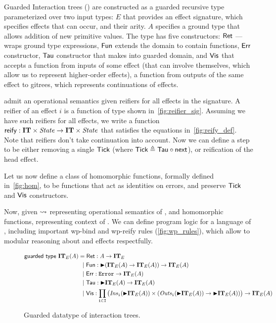 Guarded Interaction trees (\gitrees) are constructed as a guarded
recursive type parameterized over two input types: $E$ that provides
an effect signature, which specifies effects that can occur, and their
arity. $A$ specifies a ground type that allows addition of new
primitive values. The type has five constructors: $\mathsf{Ret}$ --- wraps
ground type expressions, $\mathsf{Fun}$ extends the domain to contain
functions, $\mathsf{Err}$ constructor, $\mathsf{Tau}$ constructor that makes \gitrees
into guarded domain, and $\mathsf{Vis}$ that accepts a function from inputs of
some effect (that can involve \gitrees themselves, which allow us to
represent higher-order effects), a function from outputs of the same
effect to gitrees, which represents continuations of effects.

\gitrees admit an operational semantics given reifiers for all effects
in the signature. A reifier of an effect $i$ is a function of type
shown in~\cref{fig:reifier_sig}. Assuming we have such reifiers for
all effects, we write a function $\mathsf{reify} : \mathbf{IT} \times \mathit{State} \to \mathbf{IT}
\times \mathit{State}$ that satisfies the equations in~\cref{fig:reify_def}.
Note that reifiers don't take continuation into account. Now we can
define a step to be either removing a single $\mathsf{Tick}$ (where $\mathsf{Tick}
\triangleq \mathsf{Tau} \circ \textsf{next}$), or reification of the head effect.

Let us now define a class of homomorphic functions, formally defined
in~\cref{fig:hom}, to be functions that act as identities on errors,
and preserve $\mathsf{Tick}$ and $\mathsf{Vis}$ constructors.

Now, given $\rightsquigarrow$ representing operational semantics of \gitrees,
and homomorphic functions, representing context of \gitrees. We can
define program logic for a language of \gitrees, including important
wp-bind and wp-reify rules (\cref{fig:wp_rules}), which allow to
modular reasoning about \gitrees and effects respectfully.

\begin{figure}[t]
  \begin{align*}
    \mathsf{guarded\ type}\ \mathbf{IT}_E(A) &{}= \mathsf{Ret} : A \to \mathbf{IT}_E\\
                                     &\ \ |\  \mathsf{Fun} : \mathord{\blacktriangleright} (\mathbf{IT}_E(A) \to \mathbf{IT}_E(A)) \to \mathbf{IT}_E(A)\\
                                     &\ \ |\  \mathsf{Err} : \mathtt{Error} \to \mathbf{IT}_E(A)\\
                                     &\ \ |\  \mathsf{Tau} : \mathord{\blacktriangleright} \mathbf{IT}_E(A) \to \mathbf{IT}_E(A) \\
                                     &\ \ |\  \mathsf{Vis} : \prod_{{\mathtt i} \in \mathtt{I}} \big( \mathit{Ins}_{{\mathtt i}}(\mathord{\blacktriangleright} \mathbf{IT}_E(A)) \times (\mathit{Outs}_{{\mathtt i}}(\mathord{\blacktriangleright} \mathbf{IT}_E(A)) \to \mathord{\blacktriangleright} \mathbf{IT}_E(A))\big) \to \mathbf{IT}_E(A)
  \end{align*}

  \caption{Guarded datatype of interaction trees.}
  \label{fig:gitrees_def}
\end{figure}

